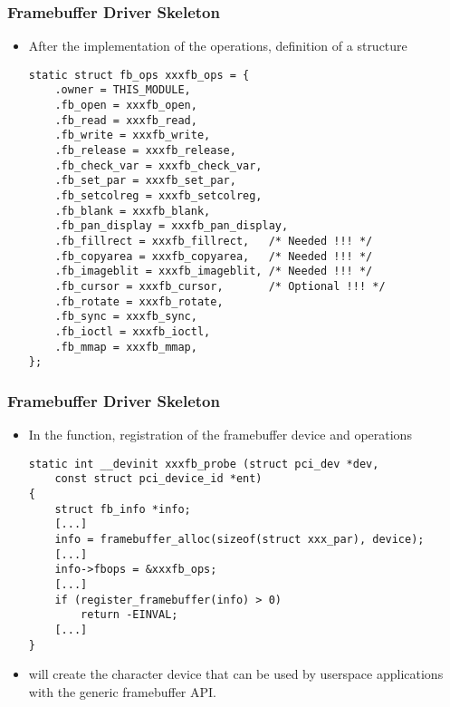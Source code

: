 \begin{frame}[fragile]
  \frametitle{Framebuffer Driver Skeleton}
  \begin{itemize}
  \item After the implementation of the operations, definition of a
     structure
  \begin{verbatim}
static struct fb_ops xxxfb_ops = {
    .owner = THIS_MODULE,
    .fb_open = xxxfb_open,
    .fb_read = xxxfb_read,
    .fb_write = xxxfb_write,
    .fb_release = xxxfb_release,
    .fb_check_var = xxxfb_check_var,
    .fb_set_par = xxxfb_set_par,
    .fb_setcolreg = xxxfb_setcolreg,
    .fb_blank = xxxfb_blank,
    .fb_pan_display = xxxfb_pan_display,
    .fb_fillrect = xxxfb_fillrect,   /* Needed !!! */
    .fb_copyarea = xxxfb_copyarea,   /* Needed !!! */
    .fb_imageblit = xxxfb_imageblit, /* Needed !!! */
    .fb_cursor = xxxfb_cursor,       /* Optional !!! */
    .fb_rotate = xxxfb_rotate,
    .fb_sync = xxxfb_sync,
    .fb_ioctl = xxxfb_ioctl,
    .fb_mmap = xxxfb_mmap,
};
  \end{verbatim}
  \end{itemize}
\end{frame}

\begin{frame}[fragile]
  \frametitle{Framebuffer Driver Skeleton}
  \begin{itemize}
  \item In the  function, registration of the
    framebuffer device and operations
  \begin{verbatim}
static int __devinit xxxfb_probe (struct pci_dev *dev,
    const struct pci_device_id *ent)
{
    struct fb_info *info;
    [...]
    info = framebuffer_alloc(sizeof(struct xxx_par), device);
    [...]
    info->fbops = &xxxfb_ops;
    [...]
    if (register_framebuffer(info) > 0)
        return -EINVAL;
    [...]
}
  \end{verbatim}
  \item {} will create the character device
    that can be used by userspace applications with the generic
    framebuffer API.
\end{itemize}
\end{frame}

